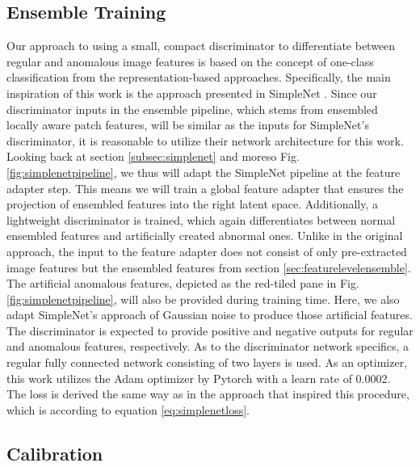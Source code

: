 \subsection{Ensemble Training}
\label{sec:discriminator}
Our approach to using a small, compact discriminator to differentiate between regular and anomalous image features is based on the concept of 
one-class classification from the representation-based approaches. Specifically, the main inspiration of this work is the approach 
presented in SimpleNet \cite{liu2023simplenet}. Since our discriminator inputs in the ensemble pipeline, which stems from ensembled locally aware patch features, 
will be similar as 
the inputs for SimpleNet's discriminator, it is reasonable to utilize their network architecture for this work. Looking back at section 
\ref{subsec:simplenet} and moreso Fig. \ref{fig:simplenetpipeline}, we thus will adapt the SimpleNet pipeline at the feature adapter step. 
This means we will train a global feature adapter that ensures the projection of ensembled features into the right latent space. Additionally, a lightweight discriminator 
is trained, which again differentiates between normal ensembled features and artificially created abnormal ones. Unlike in the original approach, the input to the feature adapter 
does not consist of only pre-extracted image features 
but the ensembled features from section \ref{sec:featurelevelensemble}. The artificial anomalous features, 
depicted as the red-tiled pane in Fig. \ref{fig:simplenetpipeline}, will also be provided during training time. Here, we also adapt SimpleNet's approach of 
Gaussian noise to produce those artificial features. %
The discriminator is expected to provide positive and negative outputs for regular and anomalous features, respectively.
As to the discriminator network specifics, a regular fully connected network consisting of two layers is used. As an optimizer, this work utilizes the 
Adam optimizer by Pytorch with a learn rate of 0.0002. The loss is derived the same way as in the approach that inspired this procedure, 
which is according to equation \ref{eq:simplenetloss}.


\subsection{Calibration}
\label{sec:Calibration}


